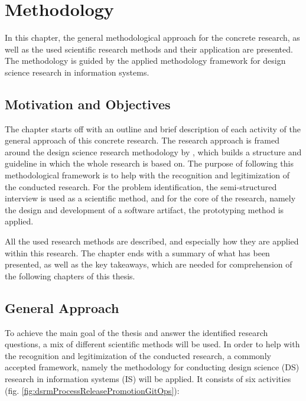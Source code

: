 \chapter{Methodology}
\label{methodology}

In this chapter,
the general methodological approach for the concrete research,
as well as
the used scientific research methods and their application
are presented.
The methodology is guided by the applied methodology framework
for design science research in information systems.






\section{Motivation and Objectives}
\label{methodology:motivation-and-objectives}


The chapter  starts off with an outline and brief description
of each activity of the general approach of this concrete research.
The research approach is framed around the design science research methodology by
\autocite{designScienceResearchMethodologyForInformationSystemsResearch},
which builds a structure and guideline in which the whole research is based on.
The purpose of following this methodological framework is to help with the recognition and
legitimization of the conducted research.
For the problem identification, the semi-structured interview is used as a scientific method,
and for the core of the research, namely the design and development of a software artifact,
the prototyping method is applied.

All the used research methods are described,
and especially how they are applied within this research.
The chapter ends with a summary of what has been presented,
as well as the key takeaways, which are needed for comprehension of the following chapters of this thesis.





\section{General Approach}
\label{methodology:approach}

To achieve the main goal of the thesis and answer the identified research questions,
a mix of different scientific methods will be used.
In order to help with the recognition and legitimization of the conducted research,
a commonly accepted framework, namely
the methodology for conducting design science (DS) research
in information systems (IS)
\autocite{designScienceResearchMethodologyForInformationSystemsResearch}
will be applied.
It consists of six activities
(fig. \ref{fig:dsrmProcessReleasePromotionGitOps}):

